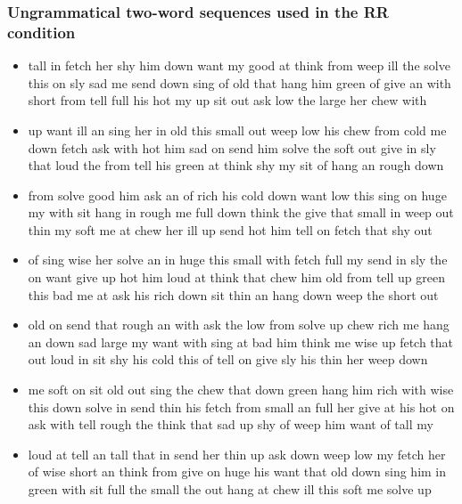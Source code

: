 \documentclass[11pt,a4wide]{article}
\begin{document}
\subsubsection*{Ungrammatical two-word sequences used in the RR condition}

\begin{itemize}

\item tall in fetch her shy him down want my good at think from weep
  ill the solve this on sly sad me send down sing of old that hang him
  green of give an with short from tell full his hot my up sit out ask
  low the large her chew with

\item up want ill an sing her in old this small out weep low his chew
  from cold me down fetch ask with hot him sad on send him solve the
  soft out give in sly that loud the from tell his green at think shy
  my sit of hang an rough down

\item from solve good him ask an of rich his cold down want low this
  sing on huge my with sit hang in rough me full down think the give
  that small in weep out thin my soft me at chew her ill up send hot
  him tell on fetch that shy out

\item of sing wise her solve an in huge this small with fetch full my
  send in sly the on want give up hot him loud at think that chew him
  old from tell up green this bad me at ask his rich down sit thin an
  hang down weep the short out

\item old on send that rough an with ask the low from solve up chew
  rich me hang an down sad large my want with sing at bad him think me
  wise up fetch that out loud in sit shy his cold this of tell on give
  sly his thin her weep down

\item me soft on sit old out sing the chew that down green hang him
  rich with wise this down solve in send thin his fetch from small an
  full her give at his hot on ask with tell rough the think that sad
  up shy of weep him want of tall my

\item loud at tell an tall that in send her thin up ask down weep low
  my fetch her of wise short an think from give on huge his want that
  old down sing him in green with sit full the small the out hang at
  chew ill this soft me solve up


\end{itemize}
\end{document}
